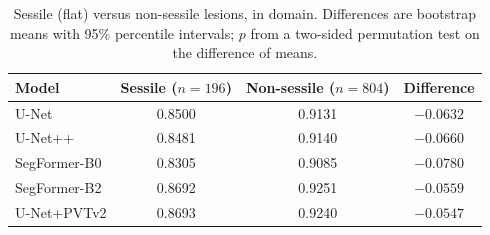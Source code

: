 \begin{table}[t]
\centering
\footnotesize
\caption{Sessile (flat) versus non-sessile lesions, in domain. Differences are bootstrap means with 95\% percentile intervals; $p$ from a two-sided permutation test on the difference of means.}
\label{tab:sessile}
\begin{tabular}{lccc}
\toprule
Model & Sessile ($n{=}196$) & Non-sessile ($n{=}804$) & Difference \\
\midrule
U-Net & 0.8500 & 0.9131 & $-0.0632$ \\
U-Net++ & 0.8481 & 0.9140 & $-0.0660$ \\
SegFormer-B0 & 0.8305 & 0.9085 & $-0.0780$ \\
SegFormer-B2 & 0.8692 & 0.9251 & $-0.0559$ \\
U-Net+PVTv2 & 0.8693 & 0.9240 & $-0.0547$ \\
\bottomrule
\end{tabular}
\end{table}
